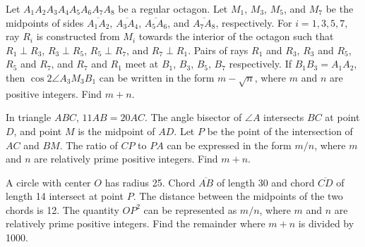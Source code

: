 \documentclass[11pt]{article}
\theoremstyle{definition}
\begin{document}
%	







\begin{question}[name={2011 AIME I, \href{https://artofproblemsolving.com/community/c4p2209774}{Problem 14}}]
	Let $A_1 A_2 A_3 A_4 A_5 A_6 A_7 A_8$ be a regular octagon. Let $M_1$, $M_3$, $M_5$, and $M_7$ be the midpoints of sides $\overline{A_1 A_2}$, $\overline{A_3 A_4}$, $\overline{A_5 A_6}$, and $\overline{A_7 A_8}$, respectively. For $i = 1, 3, 5, 7$, ray $R_i$ is constructed from $M_i$ towards the interior of the octagon such that $R_1 \perp R_3$, $R_3 \perp R_5$, $R_5 \perp R_7$, and $R_7 \perp R_1$. Pairs of rays $R_1$ and $R_3$, $R_3$ and $R_5$, $R_5$ and $R_7$, and $R_7$ and $R_1$ meet at $B_1$, $B_3$, $B_5$, $B_7$ respectively. If $B_1 B_3 = A_1 A_2$, then $\cos 2 \angle A_3 M_3 B_1$ can be written in the form $m - \sqrt{n}$, where $m$ and $n$ are positive integers. Find $m + n$.
\end{question}


%	









\begin{question}[name={2011 AIME II, \href{https://artofproblemsolving.com/community/c4p2224401}{Problem 4}}]
	In triangle $ABC$, $11 AB={20} AC$. The angle bisector of $\angle A$ intersects $BC$ at point $D$, and point $M$ is the midpoint of $AD$. Let $P$ be the point of the intersection of $AC$ and $BM$. The ratio of $CP$ to $PA$ can be expressed in the form ${m}/{n}$, where $m$ and $n$ are relatively prime positive integers. Find $m+n$.
\end{question}


%	












\begin{question}[name={2011 AIME II, \href{https://artofproblemsolving.com/community/c4p2224407}{Problem 10}}]
	A circle with center $O$ has radius 25. Chord $\overline{AB}$ of length 30 and chord $\overline{CD}$ of length 14 intersect at point $P$. The distance between the midpoints of the two chords is 12. The quantity $OP^2$ can be represented as ${m}/{n}$, where $m$ and $n$ are relatively prime positive integers. Find the remainder where $m+n$ is divided by 1000.	
	
\end{question}
\end{document}
